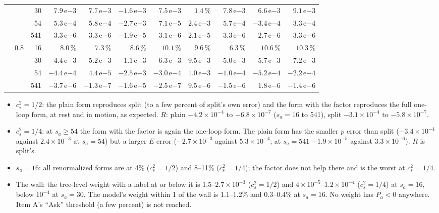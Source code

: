 \documentclass[11pt,aps,preprint,nofootinbib,superscriptaddress,tightenlines]{revtex4-2}
\begin{document}
\begin{center}
\begin{tabular}{lrr|rrrr|rrrr}
    &   & 30 & $7.9\,\mathrm e{-3}$ & $7.7\,\mathrm e{-3}$ & $-1.6\,\mathrm e{-3}$ & $7.5\,\mathrm e{-3}$ & $1.4\,\%$ & $7.8\,\mathrm e{-3}$ & $6.6\,\mathrm e{-3}$ & $9.1\,\mathrm e{-3}$ \\
    &   & 54 & $5.3\,\mathrm e{-4}$ & $5.8\,\mathrm e{-4}$ & $-2.7\,\mathrm e{-3}$ & $7.1\,\mathrm e{-5}$ & $2.4\,\mathrm e{-3}$ & $5.7\,\mathrm e{-4}$ & $-3.4\,\mathrm e{-4}$ & $3.3\,\mathrm e{-4}$ \\
    &   & 541 & $3.3\,\mathrm e{-6}$ & $3.3\,\mathrm e{-6}$ & $-1.9\,\mathrm e{-5}$ & $3.1\,\mathrm e{-6}$ & $2.1\,\mathrm e{-5}$ & $3.3\,\mathrm e{-6}$ & $2.7\,\mathrm e{-6}$ & $3.3\,\mathrm e{-6}$ \\
    & 0.8 & 16 & $8.0\,\%$ & $7.3\,\%$ & $8.6\,\%$ & $10.1\,\%$ & $9.6\,\%$ & $6.3\,\%$ & $10.6\,\%$ & $10.3\,\%$ \\
    &   & 30 & $4.4\,\mathrm e{-3}$ & $5.2\,\mathrm e{-3}$ & $-1.1\,\mathrm e{-3}$ & $6.3\,\mathrm e{-3}$ & $9.5\,\mathrm e{-3}$ & $5.0\,\mathrm e{-3}$ & $5.7\,\mathrm e{-3}$ & $7.2\,\mathrm e{-3}$ \\
    &   & 54 & $-4.4\,\mathrm e{-4}$ & $4.4\,\mathrm e{-5}$ & $-2.5\,\mathrm e{-3}$ & $-3.0\,\mathrm e{-4}$ & $1.0\,\mathrm e{-3}$ & $-1.0\,\mathrm e{-4}$ & $-5.2\,\mathrm e{-4}$ & $-2.2\,\mathrm e{-4}$ \\
    &   & 541 & $-3.7\,\mathrm e{-6}$ & $-1.3\,\mathrm e{-7}$ & $-1.6\,\mathrm e{-5}$ & $-2.5\,\mathrm e{-7}$ & $9.5\,\mathrm e{-6}$ & $-1.5\,\mathrm e{-6}$ & $1.8\,\mathrm e{-6}$ & $-1.4\,\mathrm e{-6}$ \\
\bottomrule
\end{tabular}
\end{center}
\begin{itemize}
\item $c_s^2=1/2$: the plain form reproduces split (to a few percent of split's own error) and the form with the factor reproduces the full one-loop
  form, at rest and in motion, as expected.  $R$: plain $-4.2\times10^{-4}$ to $-6.8\times10^{-7}$ ($s_a=16$ to 541), split $-3.1\times10^{-4}$ to
  $-5.8\times10^{-7}$.
\item $c_s^2=1/4$: at $s_a\ge54$ the form with the factor is again the one-loop form.  The plain form has the smaller $p$ error than split
  ($-3.4\times10^{-4}$ against $2.4\times10^{-3}$ at $s_a=54$) but a larger $E$ error ($-2.7\times10^{-3}$ against $5.3\times10^{-4}$; at $s_a=541$
  $-1.9\times10^{-5}$ against $3.3\times10^{-6}$).  $R$ is split's.
\item $s_a=16$: all renormalized forms are at 4\% ($c_s^2=1/2$) and 8--11\% ($c_s^2=1/4$); the factor does not help there and is the worst at
  $c_s^2=1/4$.
\item The wall: the tree-level weight with a label at or below it is $1.5$--$2.7\times10^{-3}$ ($c_s^2=1/2$) and $4\times10^{-5}$--$1.2\times10^{-4}$
  ($c_s^2=1/4$) at $s_a=16$, below $10^{-4}$ at $s_a=30$.  The model's weight within 1 of the wall is 1.1--1.2\% and 0.3--0.4\% at $s_a=16$.  No
  weight has $P_a<0$ anywhere.  Item A's ``Ask'' threshold (a few percent) is not reached.
\end{itemize}
\end{document}
